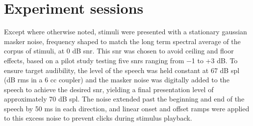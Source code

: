 \section{Experiment sessions}

Except where otherwise noted, stimuli were presented with a stationary gaussian masker noise, frequency shaped to match the long term spectral average of the corpus of stimuli, at 0 dB \ac{snr}.  This \ac{snr} was chosen to avoid ceiling and floor effects, based on a pilot study testing five \ac{snr}s ranging from −1 to +3 dB.  To ensure target audibility, the level of the speech was held constant at 67 dB \ac{spl} (dB \ac{rms} in a 6 cc coupler) and the masker noise was digitally added to the speech to achieve the desired \ac{snr}, yielding a final presentation level of approximately 70 dB \ac{spl}.  The noise extended past the beginning and end of the speech by 50 ms in each direction, and linear onset and offset ramps were applied to this excess noise to prevent clicks during stimulus playback.

